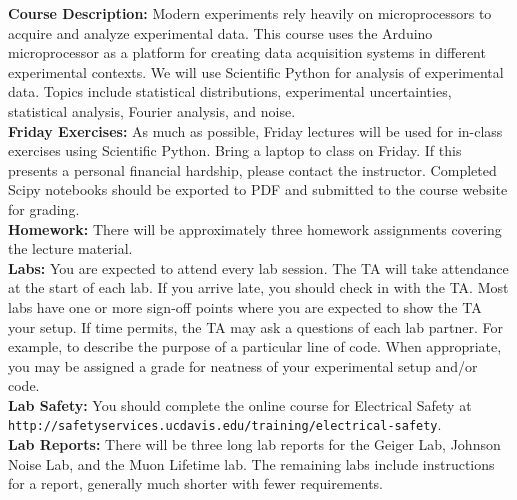 \documentclass[12pt]{article}
\begin{document}
\noindent
\textbf {Course Description:}  
Modern experiments rely heavily on microprocessors to acquire and analyze experimental data.  This course uses the Arduino microprocessor as a platform for creating data acquisition systems in different experimental contexts.   We will use Scientific Python for analysis of experimental data.  Topics include statistical distributions, experimental uncertainties, statistical analysis, Fourier analysis, and noise.\\

\noindent
\textbf {Friday Exercises:} 
As much as possible, Friday lectures will be used for in-class exercises using Scientific Python.   Bring a laptop to class on Friday.  If this presents a personal financial hardship, please contact the instructor.  Completed Scipy notebooks should be exported to PDF and submitted to the course website for grading.  \\

\noindent
\textbf{Homework:}  There will be approximately three homework assignments covering the lecture material.\\

\noindent
\textbf {Labs:} 
You are expected to attend every lab session.  The TA will take attendance at the start of each lab. If you arrive late, you should check in with the TA.   Most labs have one or more sign-off points where you are expected to show the TA your setup.  If time permits, the TA may ask a questions of each lab partner.  For example, to describe the purpose of a particular line of code.  When appropriate, you may be assigned a grade for neatness of your experimental setup and/or code.\\

\noindent
\textbf {Lab Safety:} 
You should complete the online course for Electrical Safety at \\
{\tt http://safetyservices.ucdavis.edu/training/electrical-safety}.\\

\noindent
\textbf {Lab Reports:} 
There will be three long lab reports for the Geiger Lab, Johnson Noise Lab, and the Muon Lifetime lab.  The remaining labs include instructions for a report, generally much shorter with fewer requirements.
\end{document}
